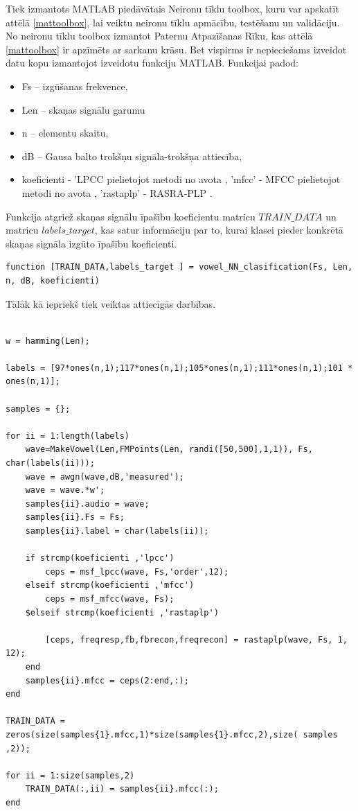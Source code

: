\documentclass[12pt,paper=A4]{report}
\begin{document}
Tiek izmantots MATLAB piedāvātais Neironu tīklu toolbox, kuru var apskatīt attēlā \ref{mattoolbox}, lai veiktu neironu tīklu apmācību, testēšanu un validāciju. No neironu tīklu toolbox izmantot Paternu Atpazīšanas Rīku, kas attēlā \ref{mattoolbox} ir apzīmēts ar sarkanu krāsu. Bet vispirms ir nepieciešams izveidot datu kopu izmantojot izveidotu funkciju MATLAB. 
Funkcijai padod:
\begin{itemize}
\item Fs – izgūšanas frekvence, 
\item Len – skaņas signālu garumu
\item n – elementu skaitu, 
\item dB – Gausa balto trokšņu signāla-trokšņa attiecība,
\item koeficienti -  'LPCC pielietojot metodi no avota \cite{dtw39},                 
'mfcc' - MFCC pielietojot metodi no avota \cite{dtw39},         
'rastaplp' - RASRA-PLP  \cite{dtw41}.
\end{itemize}



Funkcija atgriež skaņas signālu īpašību koeficientu matricu $TRAIN\_DATA$ un matricu
$labels\_target$, kas satur informāciju par to, kurai klasei pieder konkrētā skaņas signāla izgūto īpašību koeficienti. 
\begin{lstlisting}
function [TRAIN_DATA,labels_target ] = vowel_NN_clasification(Fs, Len, n, dB, koeficienti)
\end{lstlisting}

Tālāk kā iepriekš tiek veiktas attiecīgās darbības.
\begin{lstlisting}

w = hamming(Len);

labels = [97*ones(n,1);117*ones(n,1);105*ones(n,1);111*ones(n,1);101 * ones(n,1)];
 
samples = {};

for ii = 1:length(labels)
    wave=MakeVowel(Len,FMPoints(Len, randi([50,500],1,1)), Fs, char(labels(ii)));
    wave = awgn(wave,dB,'measured');
    wave = wave.*w';
    samples{ii}.audio = wave;
    samples{ii}.Fs = Fs;
    samples{ii}.label = char(labels(ii));
    
    if strcmp(koeficienti ,'lpcc')
        ceps = msf_lpcc(wave, Fs,'order',12);
    elseif strcmp(koeficienti ,'mfcc')
        ceps = msf_mfcc(wave, Fs);
    $elseif strcmp(koeficienti ,'rastaplp')

        [ceps, freqresp,fb,fbrecon,freqrecon] = rastaplp(wave, Fs, 1, 12);
    end
    samples{ii}.mfcc = ceps(2:end,:);
end

TRAIN_DATA = zeros(size(samples{1}.mfcc,1)*size(samples{1}.mfcc,2),size( samples ,2));

for ii = 1:size(samples,2)
    TRAIN_DATA(:,ii) = samples{ii}.mfcc(:);
end

\end{lstlisting}
\end{document}
